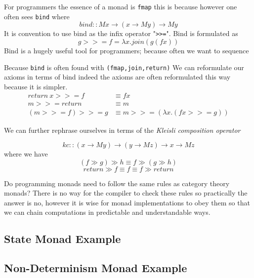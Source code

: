 \documentclass[a4paper,10pt]{article}
\theoremstyle{definition}
\begin{document}
For programmers the essence of a monad is \texttt{fmap}
this is because
however one often sees \texttt{bind} where
\begin{equation}
    bind :: M x \rightarrow (x \rightarrow M y) \rightarrow M y
\end{equation}
It is convention to use bind as the infix operator "\texttt{>>=}".
Bind is formulated as
\begin{equation}
    g >>= f = \lambda x. join (g (f x))
\end{equation}
Bind is a hugely useful tool for programmers;
because often we want to sequence

Because \texttt{bind} is often found with \texttt{(fmap,join,return)}
We can reformulate our axioms in terms of bind
indeed the axioms are often reformulated this way because it is simpler.
\begin{equation}
  \begin{split}
      return\ x >>= f     &\equiv f x \\
             m >>= return &\equiv m   \\
      (m >>= f) >>= g     &\equiv m >>= (\lambda x.(fx >>= g))
  \end{split}
\end{equation}

We can further rephrase ourselves in terms
of the \textit{Kleisli composition operator}

\begin{equation}
    kc :: (x \rightarrow M y) \rightarrow (y \rightarrow M z) \rightarrow x \rightarrow M z
\end{equation}
where we have
\begin{equation}
    (f \gg g) \gg h \equiv f \gg (g \gg h)
\end{equation}
\begin{equation}
    return \gg f \equiv f \equiv f \gg return
\end{equation}

Do programming monads need to follow the same rules as category theory monads?
There is no way for the compiler to check these rules so practically the answer is no,
however it is wise for monad implementations to obey them so that
we can chain computations in predictable and understandable ways.

\subsection{State Monad Example}
\subsection{Non-Determinism Monad Example}
\end{document}
